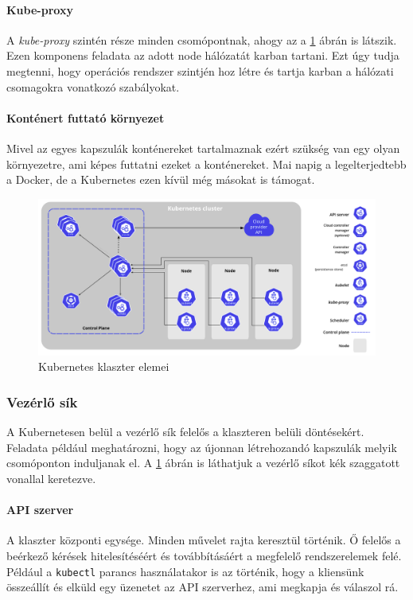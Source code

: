 \paragraph{Kube-proxy} A \textit{kube-proxy} szintén része minden csomópontnak, ahogy az a \ref{fig:k8s_components} ábrán is látszik. Ezen komponens feladata az adott node hálózatát karban tartani. Ezt úgy tudja megtenni, hogy operációs rendszer szintjén hoz létre és tartja karban a hálózati csomagokra vonatkozó szabályokat.

\paragraph{Konténert futtató környezet} Mivel az egyes kapszulák konténereket tartalmaznak ezért szükség van egy olyan környezetre, ami képes futtatni ezeket a konténereket. Mai napig a legelterjedtebb a Docker, de a Kubernetes ezen kívül még másokat is támogat. 

\begin{figure}[!ht]
\centering
\includegraphics[width=150mm, keepaspectratio]{figures/kubernetes_components.png}
\caption{Kubernetes klaszter elemei\citep{KubernetesComponents}}
\label{fig:k8s_components}
\end{figure}

\subsubsection{Vezérlő sík}
A Kubernetesen belül a vezérlő sík felelős a klaszteren belüli döntésekért. Feladata például meghatározni, hogy az újonnan létrehozandó kapszulák melyik csomóponton induljanak el. A \ref{fig:k8s_components} ábrán is láthatjuk a vezérlő síkot kék szaggatott vonallal keretezve.

\paragraph{API szerver} A klaszter központi egysége. Minden művelet rajta keresztül történik. Ő felelős a beérkező kérések hitelesítéséért és továbbításáért a megfelelő rendszerelemek felé. Például a \verb+kubectl+ parancs használatakor is az történik, hogy a kliensünk összeállít és elküld egy üzenetet az API szerverhez, ami megkapja és válaszol rá.

